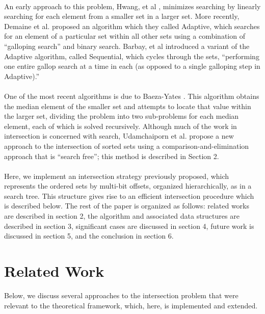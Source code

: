 \documentclass[11pt,letterpaper]{article}
\begin{document}
\paragraph{}
An early approach to this problem, Hwang, et al \cite{hwang:10},
minimizes searching by linearly searching for each element from a smaller set
in a larger set. More recently, Demaine et al. \cite{338634} proposed an algorithm
which they called Adaptive, which searches for an element of a particular set 
within all other sets using a combination of ``galloping search'' and binary search.
Barbay, et al \cite{1564507} introduced a variant of the Adaptive algorithm,
called Sequential, which cycles through the sets, ``performing one entire
gallop search at a time in each (as opposed to a single galloping step
in Adaptive).''

\paragraph{}
One of the most recent algorithms is due to Baeza-Yates \cite{BY:03}.
This algorithm obtains the median element of the smaller set and attempts
to locate that value within the larger set, dividing the problem into
two sub-problems for each median element, each of which is solved recursively.
Although much of the work in intersection is concerned with search,
Udamchaiporn et al. propose a new approach to the intersection of sorted sets
using a comparison-and-elimination approach that is ``search free''; this method
is described in Section 2.

\paragraph{}
Here, we implement an intersection strategy previously proposed,
which represents the ordered sets by multi-bit offsets, organized hierarchically,
as in a search tree.  This structure gives rise to an efficient intersection procedure
which is described below.
The rest of the paper is organized as follows: related works
are described in section 2, the algorithm and associated data structures are
described in section 3, significant cases are discussed in section 4, future work is
discussed in section 5, and the conclusion in section 6.



\section{Related Work}
Below, we discuss several approaches to the intersection problem that
were relevant to the theoretical framework, which, here, is implemented
and extended.
\end{document}
